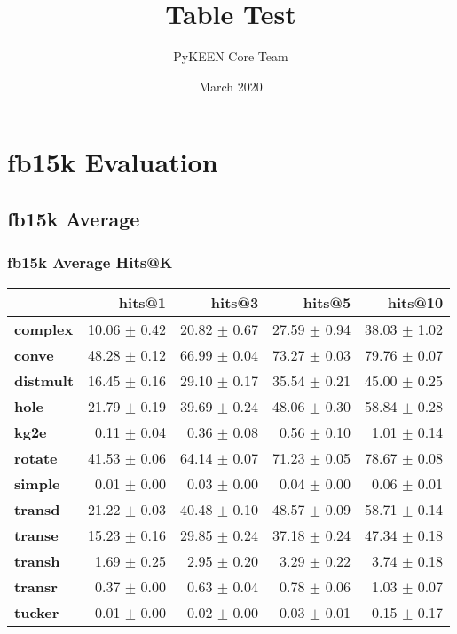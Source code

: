 \documentclass{article}
\title{Table Test}
\author{PyKEEN Core Team}
\date{March 2020}
\begin{document}
\section{fb15k Evaluation}
\subsection{fb15k Average}
\subsubsection{fb15k Average Hits@K}
    \begin{center}
    \begin{tabular}{lrrrr}
\toprule
{} &        hits@1 &        hits@3 &        hits@5 &       hits@10 \\
\midrule
\textbf{complex } &  10.06 $\pm$ 0.42 &  20.82 $\pm$ 0.67 &  27.59 $\pm$ 0.94 &  38.03 $\pm$ 1.02 \\
\textbf{conve   } &  48.28 $\pm$ 0.12 &  66.99 $\pm$ 0.04 &  73.27 $\pm$ 0.03 &  79.76 $\pm$ 0.07 \\
\textbf{distmult} &  16.45 $\pm$ 0.16 &  29.10 $\pm$ 0.17 &  35.54 $\pm$ 0.21 &  45.00 $\pm$ 0.25 \\
\textbf{hole    } &  21.79 $\pm$ 0.19 &  39.69 $\pm$ 0.24 &  48.06 $\pm$ 0.30 &  58.84 $\pm$ 0.28 \\
\textbf{kg2e    } &   0.11 $\pm$ 0.04 &   0.36 $\pm$ 0.08 &   0.56 $\pm$ 0.10 &   1.01 $\pm$ 0.14 \\
\textbf{rotate  } &  41.53 $\pm$ 0.06 &  64.14 $\pm$ 0.07 &  71.23 $\pm$ 0.05 &  78.67 $\pm$ 0.08 \\
\textbf{simple  } &   0.01 $\pm$ 0.00 &   0.03 $\pm$ 0.00 &   0.04 $\pm$ 0.00 &   0.06 $\pm$ 0.01 \\
\textbf{transd  } &  21.22 $\pm$ 0.03 &  40.48 $\pm$ 0.10 &  48.57 $\pm$ 0.09 &  58.71 $\pm$ 0.14 \\
\textbf{transe  } &  15.23 $\pm$ 0.16 &  29.85 $\pm$ 0.24 &  37.18 $\pm$ 0.24 &  47.34 $\pm$ 0.18 \\
\textbf{transh  } &   1.69 $\pm$ 0.25 &   2.95 $\pm$ 0.20 &   3.29 $\pm$ 0.22 &   3.74 $\pm$ 0.18 \\
\textbf{transr  } &   0.37 $\pm$ 0.00 &   0.63 $\pm$ 0.04 &   0.78 $\pm$ 0.06 &   1.03 $\pm$ 0.07 \\
\textbf{tucker  } &   0.01 $\pm$ 0.00 &   0.02 $\pm$ 0.00 &   0.03 $\pm$ 0.01 &   0.15 $\pm$ 0.17 \\
\bottomrule
\end{tabular}

    \end{center}
\end{document}
